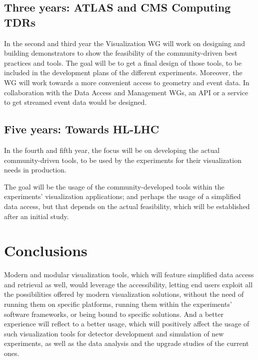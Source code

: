 \documentclass[12pt,a4paper]{article}
\begin{document}
\hypertarget{three-year}{%
\subsection{Three years: ATLAS and CMS Computing TDRs}\label{three-year}}

In the second and third year the Visualization WG will work on designing and building demonstrators to show the feasibility of
the community-driven best practices and tools. The goal will be to get a final design of those tools, to be included in the development
plans of the different experiments. Moreover, the WG will work towards a more convenient access to geometry and event data.
In collaboration with the Data Access and Management WGs, an API or a service to get streamed event data would be designed.

\hypertarget{five-year}{%
\subsection{Five years: Towards HL-LHC}\label{five-year}}

In the fourth and fifth year, the focus will be on developing the actual community-driven tools, to be used by the experiments
for their visualization needs in production.

The goal will be the usage of the community-developed tools within the experiments’ visualization applications; and
perhaps the usage of a simplified data access, but that depends on the actual feasibility, which will be established
after an initial study.

\hypertarget{conclusions}{%
\section{Conclusions}\label{conclusions}}

Modern and modular visualization tools, which will feature simplified data access and retrieval as well, would leverage
the accessibility, letting end users exploit all the possibilities offered by modern visualization solutions, without the need
of running them on specific platforms, running them within the experiments’ software frameworks, or being bound to specific solutions.
And a better experience will reflect to a better usage, which will positively affect the usage of such visualization tools for
detector development and simulation of new experiments, as well as the data analysis and the upgrade studies of the current ones.
\end{document}
